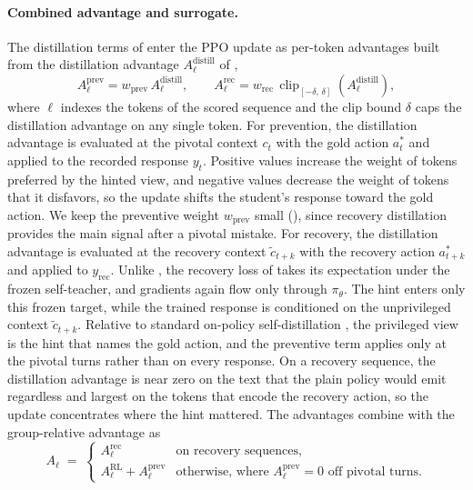 \paragraph{Combined advantage and surrogate.} The distillation terms of  enter the PPO update as per-token advantages built from the distillation advantage $A^{\mathrm{distill}}_\ell$ of ,
\begin{equation}
A^{\mathrm{prev}}_{\ell} = w_\text{prev}\, A^{\mathrm{distill}}_\ell,
\qquad
A^{\mathrm{rec}}_{\ell} = w_\text{rec}\, \operatorname{clip}_{[-\delta,\, \delta]}\!\left( A^{\mathrm{distill}}_\ell \right),
\label{eq:advantage}
\end{equation}
where $\ell$ indexes the tokens of the scored sequence and the clip bound $\delta$ caps the distillation advantage on any single token. For prevention, the distillation advantage is evaluated at the pivotal context $c_t$ with the gold action $a^{*}_t$ and applied to the recorded response $y_t$. Positive values increase the weight of tokens preferred by the hinted view, and negative values decrease the weight of tokens that it disfavors, so the update shifts the student's response toward the gold action. We keep the preventive weight $w_\text{prev}$ small (), since recovery distillation provides the main signal after a pivotal mistake. For recovery, the distillation advantage is evaluated at the recovery context $\tilde{c}_{t+k}$ with the recovery action $a^{*}_{t+k}$ and applied to $y_\text{rec}$. Unlike , the recovery loss of  takes its expectation under the frozen self-teacher, and gradients again flow only through $\pi_\theta$. The hint enters only this frozen target, while the trained response is conditioned on the unprivileged context $\tilde{c}_{t+k}$. Relative to standard on-policy self-distillation \citep{zhao2026opsd}, the privileged view is the hint that names the gold action, and the preventive term applies only at the pivotal turns rather than on every response. On a recovery sequence, the distillation advantage is near zero on the text that the plain policy would emit regardless and largest on the tokens that encode the recovery action, so the update concentrates where the hint mattered. The advantages combine with the group-relative advantage as
\begin{equation}
A_{\ell} \;=\;
\begin{cases}
A^{\mathrm{rec}}_{\ell} & \text{on recovery sequences}, \\[2pt]
A^{\mathrm{RL}}_{\ell} + A^{\mathrm{prev}}_{\ell} & \text{otherwise, where } A^{\mathrm{prev}}_{\ell} = 0 \text{ off pivotal turns}.
\end{cases}
\label{eq:combined}
\end{equation}
